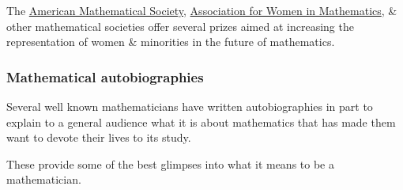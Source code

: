 \documentclass{article}
\begin{document}
%
The \href{https://en.wikipedia.org/wiki/American_Mathematical_Society}{American Mathematical Society}, \href{https://en.wikipedia.org/wiki/Association_for_Women_in_Mathematics}{Association for Women in Mathematics}, \& other mathematical societies offer several prizes aimed at increasing the representation of women \& minorities in the future of mathematics.

\subsubsection{Mathematical autobiographies}
Several well known mathematicians have written autobiographies in part to explain to a general audience what it is about mathematics that has made them want to devote their lives to its study.

These provide some of the best glimpses into what it means to be a mathematician.
\end{document}
